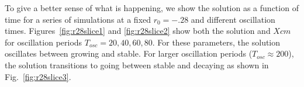 \documentclass[pre,preprint,superscriptaddress]{revtex4-1}
\begin{document}
To give a better sense of what is happening, we show the solution as a function of time for a series of simulations at a fixed $r_0=-.28$ and different oscillation times. Figures~\ref{fig:r28slice1} and \ref{fig:r28slice2} show both the solution and $Xcm$ for oscillation periods $T_{osc}=20,40,60,80$.  For these parameters, the solution oscillates between growing and stable. For larger oscillation periods ($T_{osc} \approx 200$), the solution transitions to going between stable and decaying as shown in Fig.~\ref{fig:r28slice3}.  
 \begin{figure}[h!]
  \begin{center}
    \mbox{
      	\quad 
      } \mbox{
      	\quad 
}
\end{center}
\end{figure}
\end{document}

